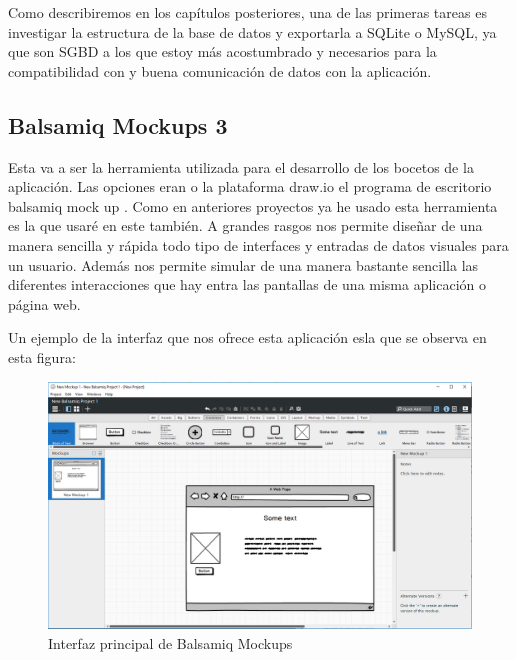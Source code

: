 Como describiremos en los capítulos posteriores, una de las primeras tareas es investigar la estructura de la base de datos y exportarla a SQLite o MySQL, ya que son SGBD a los que estoy más acostumbrado y necesarios para la compatibilidad con y buena comunicación de datos con la aplicación. 

\subsection{Balsamiq Mockups 3}

Esta va a ser la herramienta utilizada para el desarrollo de los bocetos de la aplicación. Las opciones eran o la plataforma draw.io el programa de escritorio balsamiq mock up \cite{balsamiq}. Como en anteriores proyectos ya he usado esta herramienta es la que usaré en este también. A grandes rasgos nos permite diseñar de una manera sencilla y rápida todo tipo de interfaces y entradas de datos visuales para un usuario. Además nos permite simular de una manera bastante sencilla las diferentes interacciones que hay entra las pantallas de una misma aplicación o página web. 

Un ejemplo de la interfaz que nos ofrece esta aplicación esla que se observa en esta figura: 

\begin{figure}[H]
    \centering
    \includegraphics[scale=0.4]{imagenes/fundamentosHerramientas/balsamiq.png}
    \caption{Interfaz principal de Balsamiq Mockups}
    \label{fig:balsamiq}
\end{figure}
